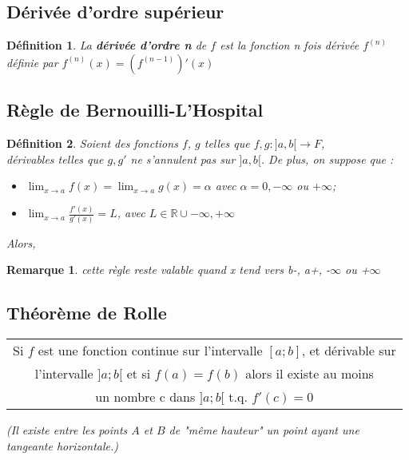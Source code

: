 \documentclass[12pt, a4paper]{book}
\newtheorem*{definition}{Définition}
\newtheorem*{remarque}{Remarque}
\begin{document}
\subsection{Dérivée d'ordre supérieur}
\begin{definition}
    La \textbf{dérivée d'ordre n} de $f$ est la fonction n fois dérivée $f^{(n)}$ définie par $f^{(n)}(x) = (f^{(n-1)})'(x)$ 
\end{definition}
\subsection{Règle de Bernouilli-L'Hospital}
\begin{definition}
    Soient des fonctions $f$, $g$ telles que $f, g : ]a,b[ \rightarrow F$, \\
    dérivables telles que $g, g'$ ne s'annulent pas sur $]a,b[$. De plus, on suppose que :
    \begin{itemize}
        \item  $\lim_{x \to a} f(x) = \lim_{x \to a} g(x) = \alpha$ avec $\alpha= 0, - \infty$ ou $+\infty$;
        \item $\lim_{x \to a} \frac{f'(x)}{g'(x)} = L$, avec $L \in \mathbb{R} \cup {-\infty, +\infty}$
    \end{itemize}
Alors,
\begin{center}
\end{center}
\end{definition}
\begin{remarque}
    cette règle reste valable quand x tend vers b-, a+, -$\infty$ ou +$\infty$
\end{remarque}
\newpage
\subsection{Théorème de Rolle}
\begin{tabular}{ |c|}
    \hline
    Si $f$ est une fonction continue sur l'intervalle $[a;b]$, et dérivable sur\\
     l'intervalle $]a;b[$ et si $f(a) = f(b)$ alors il existe au moins\\
    un nombre c dans $]a;b[$ t.q. $f'(c)=0$\\
    \hline
\end{tabular}
\textit{(Il existe entre les points $A$ et $B$ de "même hauteur" un point ayant une tangeante horizontale.)}\\
\end{document}
